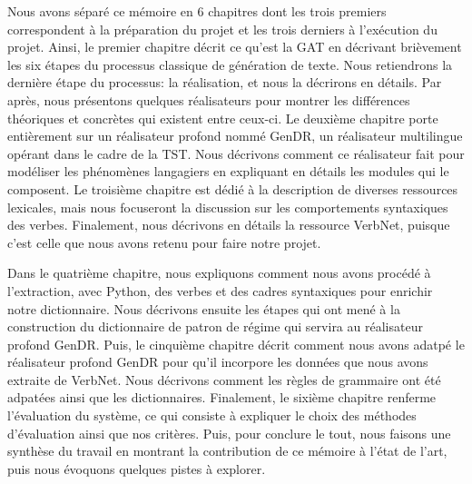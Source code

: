 Nous avons séparé ce mémoire en 6 chapitres dont les trois premiers correspondent à la préparation du projet et les trois derniers à l'exécution du projet. Ainsi, le premier chapitre décrit ce qu'est la \ac{GAT} en décrivant brièvement les six étapes du processus classique de génération de texte. Nous retiendrons la dernière étape du processus: la réalisation, et nous la décrirons en détails. Par après, nous présentons quelques réalisateurs pour montrer les différences théoriques et concrètes qui existent entre ceux-ci. Le deuxième chapitre porte entièrement sur un réalisateur profond nommé GenDR, un réalisateur multilingue opérant dans le cadre de la \ac{TST}. Nous décrivons comment ce réalisateur fait pour modéliser les phénomènes langagiers en expliquant en détails les modules qui le composent. Le troisième chapitre est dédié à la description de diverses ressources lexicales, mais nous focuseront la discussion sur les comportements syntaxiques des verbes. Finalement, nous décrivons en détails la ressource VerbNet, puisque c'est celle que nous avons retenu pour faire notre projet.

Dans le quatrième chapitre, nous expliquons comment nous avons procédé à l'extraction, avec Python, des verbes et des cadres syntaxiques pour enrichir notre dictionnaire. Nous décrivons ensuite les étapes qui ont mené à la construction du dictionnaire de patron de régime qui servira au réalisateur profond GenDR. Puis, le cinquième chapitre décrit comment nous avons adatpé le réalisateur profond GenDR pour qu'il incorpore les données que nous avons extraite de VerbNet. Nous décrivons comment les règles de grammaire ont été adpatées ainsi que les dictionnaires. Finalement, le sixième chapitre renferme l'évaluation du système, ce qui consiste à expliquer le choix des méthodes d'évaluation ainsi que nos critères. Puis, pour conclure le tout, nous faisons une synthèse du travail en montrant la contribution de ce mémoire à l'état de l'art, puis nous évoquons quelques pistes à explorer.

